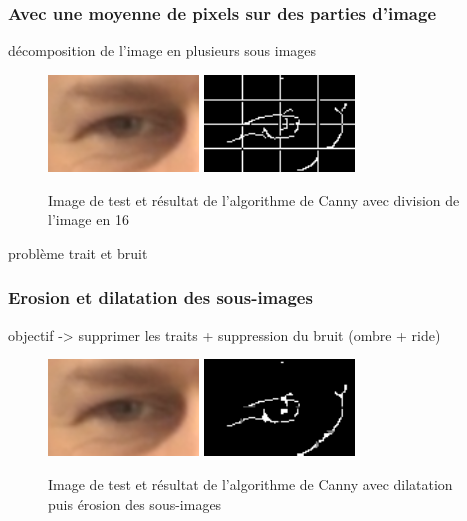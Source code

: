 \subsubsection{Avec une moyenne de pixels sur des parties d'image}

décomposition de l'image en plusieurs sous images
\begin{figure}[H]
 \center
 \includegraphics[width=4cm]{image/original.png}
 \includegraphics[width=4cm]{image/canny_decomposition.png}
 \caption{Image de test et résultat de l'algorithme de Canny avec division de l'image en 16}
\end{figure}

problème trait et bruit

\subsubsection{Erosion et dilatation des sous-images}

objectif -> supprimer les traits + suppression du bruit (ombre + ride)
\begin{figure}[H]
 \center
 \includegraphics[width=4cm]{image/original.png}
 \includegraphics[width=4cm]{image/canny_final.png}
 \caption{Image de test et résultat de l'algorithme de Canny avec dilatation puis érosion des sous-images}
\end{figure}

